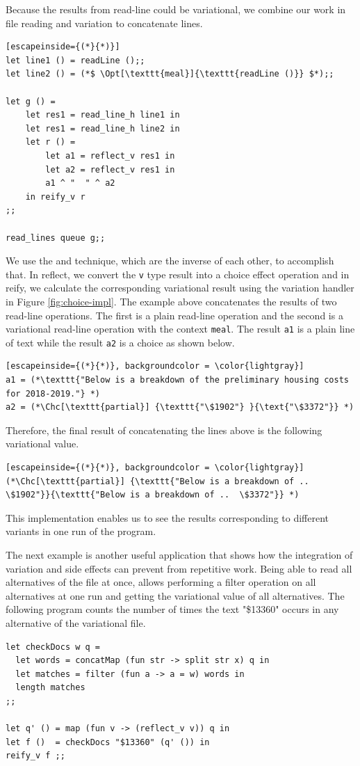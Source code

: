 Because the results from read-line could be variational, we combine our work in file reading and variation to concatenate lines. 
%
\begin{lstlisting}[escapeinside={(*}{*)}]
let line1 () = readLine ();;
let line2 () = (*$ \Opt[\texttt{meal}]{\texttt{readLine ()}} $*);;

let g () =
    let res1 = read_line_h line1 in 
    let res1 = read_line_h line2 in 
    let r () = 
        let a1 = reflect_v res1 in
        let a2 = reflect_v res1 in
        a1 ^ "  " ^ a2 
    in reify_v r 
;;

read_lines queue g;;
\end{lstlisting}
%
We use the  and  technique, which are the inverse of each other, to accomplish that. In reflect, we convert the \texttt{v} type result into a choice effect operation and in reify, we calculate the corresponding variational result using the variation handler in Figure \ref{fig:choice-impl}. The example above concatenates the results of two read-line operations. The first is a plain read-line operation and the second is a variational read-line operation with the context \texttt{meal}.
The result \texttt{a1} is a plain line of text while the result \texttt{a2} is a choice as shown below.  
%
\begin{lstlisting}[escapeinside={(*}{*)}, backgroundcolor = \color{lightgray}]
a1 = (*\texttt{"Below is a breakdown of the preliminary housing costs for 2018-2019."} *)
a2 = (*\Chc[\texttt{partial}] {\texttt{"\$1902"} }{\text{"\$3372"}} *) 
\end{lstlisting}
%
Therefore, the final result of concatenating the lines above is the following variational value.
%
\begin{lstlisting}[escapeinside={(*}{*)}, backgroundcolor = \color{lightgray}]
(*\Chc[\texttt{partial}] {\texttt{"Below is a breakdown of ..  \$1902"}}{\texttt{"Below is a breakdown of ..  \$3372"}} *)
\end{lstlisting}
%
This implementation enables us to see the results corresponding to different variants in one run of the program. 

The next example is another useful application that shows how the integration of variation and side effects can prevent from repetitive work. Being able to read all alternatives of the file at once, allows performing a filter operation on all alternatives at one run and getting the variational value of all alternatives. The following program counts the number of times the text "\$13360" occurs in any alternative of the variational file. 
%
\begin{lstlisting}[]
let checkDocs w q =
  let words = concatMap (fun str -> split str x) q in
  let matches = filter (fun a -> a = w) words in
  length matches
;;
			
let q' () = map (fun v -> (reflect_v v)) q in
let f ()  = checkDocs "$13360" (q' ()) in
reify_v f ;;

\end{lstlisting}


